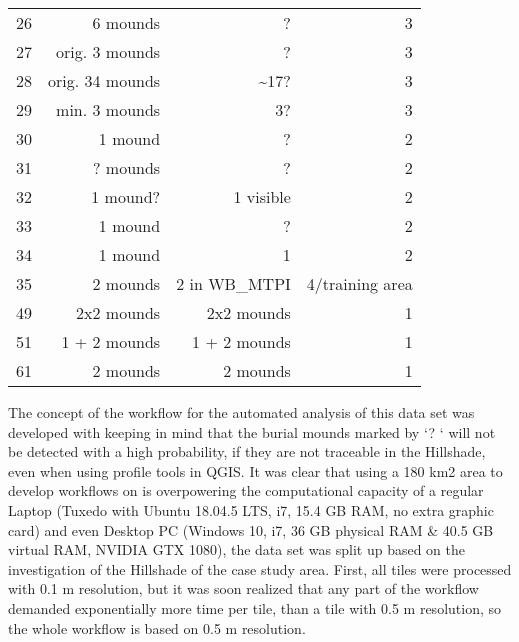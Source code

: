 \documentclass[
  12pt,
]{article}
\begin{document}
\begin{longtable}[]{@{}rrrr@{}}
26 & 6 mounds & ? & 3 \\
27 & orig. 3 mounds & ? & 3 \\
28 & orig. 34 mounds & \textasciitilde17? & 3 \\
29 & min. 3 mounds & 3? & 3 \\
30 & 1 mound & ? & 2 \\
31 & ? mounds & ? & 2 \\
32 & 1 mound? & 1 visible & 2 \\
33 & 1 mound & ? & 2 \\
34 & 1 mound & 1 & 2 \\
35 & 2 mounds & 2 in WB\_MTPI & 4/training area \\
49 & 2x2 mounds & 2x2 mounds & 1 \\
51 & 1 + 2 mounds & 1 + 2 mounds & 1 \\
61 & 2 mounds & 2 mounds & 1 \\
\bottomrule
\end{longtable}

The concept of the workflow for the automated analysis of this data set was developed with keeping in mind that the burial mounds marked by `? ` will not be detected with a high probability, if they are not traceable in the Hillshade, even when using profile tools in QGIS. It was clear that using a 180 km2 area to develop workflows on is overpowering the computational capacity of a regular Laptop (Tuxedo with Ubuntu 18.04.5 LTS, i7, 15.4 GB RAM, no extra graphic card) and even Desktop PC (Windows 10, i7, 36 GB physical RAM \& 40.5 GB virtual RAM, NVIDIA GTX 1080), the data set was split up based on the investigation of the Hillshade of the case study area. First, all tiles were processed with 0.1 m resolution, but it was soon realized that any part of the workflow demanded exponentially more time per tile, than a tile with 0.5 m resolution, so the whole workflow is based on 0.5 m resolution.
\end{document}
